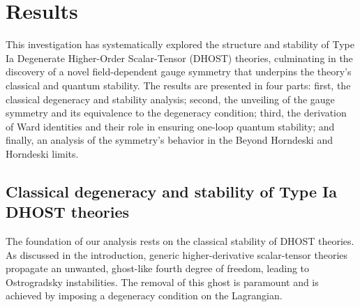 \documentclass[twocolumn]{aastex631}
\begin{document}
\section{Results}
\label{sec:results}
\label{sec:results}
This investigation has systematically explored the structure and stability of Type Ia Degenerate Higher-Order Scalar-Tensor (DHOST) theories, culminating in the discovery of a novel field-dependent gauge symmetry that underpins the theory's classical and quantum stability. The results are presented in four parts: first, the classical degeneracy and stability analysis; second, the unveiling of the gauge symmetry and its equivalence to the degeneracy condition; third, the derivation of Ward identities and their role in ensuring one-loop quantum stability; and finally, an analysis of the symmetry's behavior in the Beyond Horndeski and Horndeski limits.

\subsection{Classical degeneracy and stability of Type Ia DHOST theories}
The foundation of our analysis rests on the classical stability of DHOST theories. As discussed in the introduction, generic higher-derivative scalar-tensor theories propagate an unwanted, ghost-like fourth degree of freedom, leading to Ostrogradsky instabilities. The removal of this ghost is paramount and is achieved by imposing a degeneracy condition on the Lagrangian.
\end{document}
